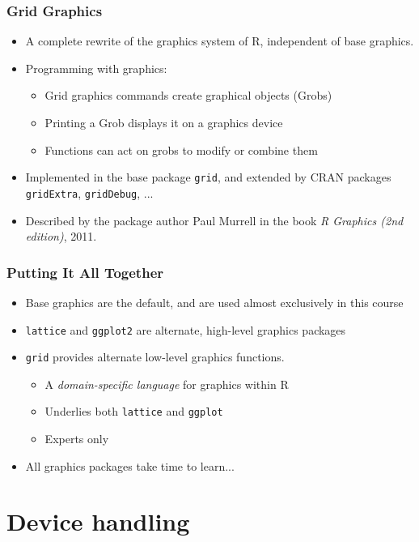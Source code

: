\documentclass[xcolor=svgnames]{beamer}
\newcommand{\code}[1]{\texttt{#1}}
\begin{document}
\begin{frame}
   \frametitle{Grid Graphics}

   \begin{itemize}
   \item A complete rewrite of the graphics system of R, independent of
      base graphics.
   \item Programming with graphics:
      \begin{itemize}
      \item Grid graphics commands create graphical objects (Grobs)
      \item Printing a Grob displays it on a graphics device
      \item Functions can act on grobs to modify or combine them
      \end{itemize}
   \item Implemented in the base package \code{grid}, and extended
      by CRAN packages \code{gridExtra}, \code{gridDebug}, ...
   \item Described by the package author Paul Murrell in the book
       {\em R Graphics (2nd edition)}, 2011.
   \end{itemize}

\end{frame}

\begin{frame}
   \frametitle{Putting It All Together}

   \begin{itemize}
   \item Base graphics are the default, and are used almost exclusively
         in this course
   \item \code{lattice} and \code{ggplot2} are alternate, high-level
         graphics packages
   \item \code{grid} provides alternate low-level graphics functions. 
      \begin{itemize}
      \item A {\em domain-specific language} for graphics within R
      \item Underlies both \code{lattice} and \code{ggplot}
      \item Experts only
      \end{itemize}
   \item All graphics packages take time to learn...
   \end{itemize}

\end{frame}

\section{Device handling} 
\end{document}
